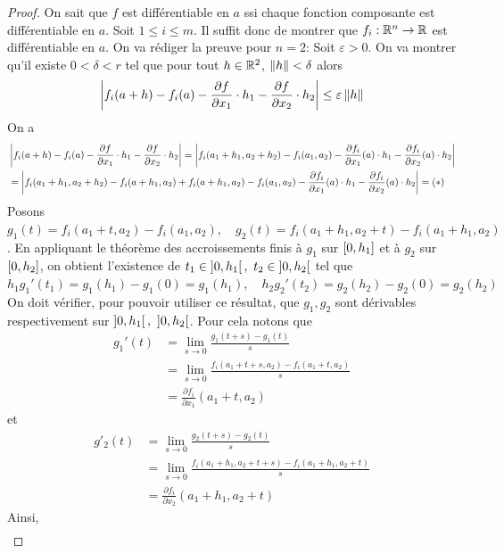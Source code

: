 \begin{proof}
    On sait que $f$ est différentiable en $a$ ssi chaque fonction composante est différentiable en $a$.
    Soit $1\leq i\leq m$. Il suffit donc de montrer que $f_i:\mathbb{R}^n\to \mathbb{R}$ est différentiable en $a$.
    On va rédiger la preuve pour $n=2$: Soit $\varepsilon >0$. On va montrer qu'il existe $0<\delta<r$ tel que pour tout $h\in \mathbb{R}^2$, $\left\| h \right\|<\delta$ alors 
    \begin{equation*}
        \left| f_i(a+h)-f_i(a)-\frac{\partial f}{\partial x_1}\cdot h_1-\frac{\partial f}{\partial x_2}\cdot h_2 \right|\leq  \varepsilon\left\| h \right\|
    \end{equation*}
    On a 
    \begin{align*}
       &\left| f_i(a+h)-f_i(a)-\frac{\partial f}{\partial x_1}\cdot h_1-\frac{\partial f}{\partial x_2}\cdot h_2 \right|
       =\left| f_i(a_1+h_1,a_2+h_2)-f_i(a_1,a_2)-\frac{\partial f_i}{\partial x_1}(a)\cdot h _1-\frac{\partial f_i}{\partial x_2}(a)\cdot h _2 \right|\\
       &= \left| f_i(a_1+h_1,a_2+h_2)-f_i(a+h_1,a_2)+f_i(a+h_1,a_2)-f_i(a_1,a_2)-\frac{\partial f_i}{\partial x_1}(a)\cdot h _1-\frac{\partial f_i}{\partial x_2}(a)\cdot h _2 \right| = (*)
    \end{align*}
    Posons $g_1(t)=f_i(a_1+t,a_2) - f_i(a_1,a_2),\quad g_2(t) = f_i(a_1+h_1, a_2+ t)-f_i(a_1+h_1, a_2)$. En appliquant le théorème des accroissements finis à $g_1$ sur $\left[ 0,h_1\right]$ et à $g_2$ sur $\left[ 0,h_2\right]$, on obtient l'existence de $t_1\in\interoo{0,h_1},\ t_2\in\interoo{0,h_2}$ tel que $h_1g_1'(t_1) = g_1(h_1)-g_1(0)= g_1(h_1),\quad h_2g_2'(t_2) = g_2(h_2)-g_2(0)= g_2(h_2)$
    On doit vérifier, pour pouvoir utiliser ce résultat, que $g_1, g_2$ sont dérivables respectivement sur $\left] 0,h_1\right[,\ \left] 0,h_2\right[$. Pour cela notons que 
    \begin{align*}
    g_1'(t)&=\lim_{s\to 0}\frac{g_1(t+s)-g_1(t)}{s}\\
    &=\lim_{s\to 0} \frac{f_i(a_1+t+s,a_2)-f_i(a_1+t,a_2)}{s}\\
    &=\frac{\partial f_i}{\partial x_1}(a_1+t,a_2)
    \end{align*}
    et
    \begin{align*}
    g'_2(t)&=\lim_{s\to  0}\frac{g_2(t+s)-g_2(t)}{s}\\
    &=\lim_{s\to 0}\frac{f_i(a_1+h_1,a_2+t+s)-f_i(a_1+h_1,a_2+t)}{s}\\
    &= \frac{\partial f_i}{\partial x_2}(a_1+h_1,a_2+t)
    \end{align*}
    Ainsi, \begin{align*}

\end{align*}
\end{proof}
